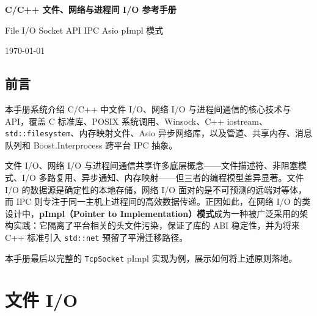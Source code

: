 \documentclass[12pt,a4paper,fontset=fandol]{ctexbook}
\newcommand{\cpp}[1]{C++#1}
\newcommand{\Tp}[1]{\texttt{#1}}
\begin{document}
\frontmatter

\begin{titlepage}
\centering
\vspace*{3cm}
{\Huge\bfseries\color{algheadbg} C/C++ 文件、网络与进程间 I/O 参考手册\par}
\vspace{1cm}
{\LARGE\color{blue!70!black} File I/O \textbullet{} Socket API \textbullet{} IPC \textbullet{} Asio \textbullet{} pImpl 模式\par}
\vfill
{\large\color{gray} \today\par}
\end{titlepage}

\chapter*{前言}

本手册系统介绍 C/C++ 中文件 I/O、网络 I/O 与进程间通信的核心技术与 API，覆盖 C 标准库、POSIX 系统调用、Winsock、C++ iostream、\Tp{std::filesystem}、内存映射文件、Asio 异步网络库，以及管道、共享内存、消息队列和 Boost.Interprocess 跨平台 IPC 抽象。

文件 I/O、网络 I/O 与进程间通信共享许多底层概念——文件描述符、非阻塞模式、I/O 多路复用、异步通知、内存映射——但三者的编程模型差异显著。文件 I/O 的数据源是确定性的本地存储，网络 I/O 面对的是不可预测的远端对等体，而 IPC 则专注于同一主机上进程间的高效数据传递。正因如此，在网络 I/O 的类设计中，\textbf{pImpl（Pointer to Implementation）模式}成为一种被广泛采用的架构实践：它隔离了平台相关的头文件污染，保证了库的 ABI 稳定性，并为将来 \cpp{} 标准引入 \Tp{std::net} 预留了平滑迁移路径。

本手册最后以完整的 \Tp{TcpSocket} pImpl 实现为例，展示如何将上述原则落地。

\makeatletter
{}
\makeatother

\mainmatter

\part{文件 I/O}
\end{document}
